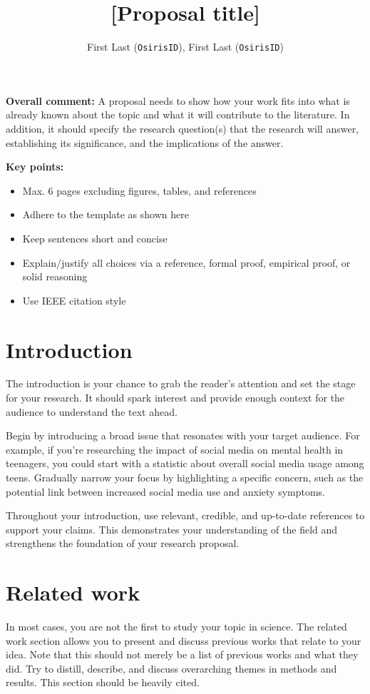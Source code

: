 \documentclass[10pt,a4paper]{article}
\title{[Proposal title]}
\author{
    First Last (\texttt{OsirisID}), 
    First Last (\texttt{OsirisID})
}
\date{}  %
\begin{document}
\maketitle

\textbf{Overall comment:}
A proposal needs to show how your work fits into what is already known about the topic and what it will contribute to the literature. In addition, it should specify the research question(s) that the research will answer, establishing its significance, and the implications of the answer.

\textbf{Key points:}
\begin{itemize}
    \item Max. 6 pages excluding figures, tables, and references
    \item Adhere to the template as shown here
    \item Keep sentences short and concise
    \item Explain/justify all choices via a reference, formal proof, empirical proof, or solid reasoning
    \item Use IEEE citation style
\end{itemize}

\section{Introduction}\label{sec:introduction}
The introduction is your chance to grab the reader's attention and set the stage for your research. It should spark interest and provide enough context for the audience to understand the text ahead.

Begin by introducing a broad issue that resonates with your target audience. For example, if you're researching the impact of social media on mental health in teenagers, you could start with a statistic about overall social media usage among teens. Gradually narrow your focus by highlighting a specific concern, such as the potential link between increased social media use and anxiety symptoms.

Throughout your introduction, use relevant, credible, and up-to-date references to support your claims. This demonstrates your understanding of the field and strengthens the foundation of your research proposal.

\section{Related work}\label{sec:relatedwork}
In most cases, you are not the first to study your topic in science. The related work section allows you to present and discuss previous works that relate to your idea. Note that this should not merely be a list of previous works and what they did. Try to distill, describe, and discuss overarching themes in methods and results. This section should be heavily cited. 
\end{document}

